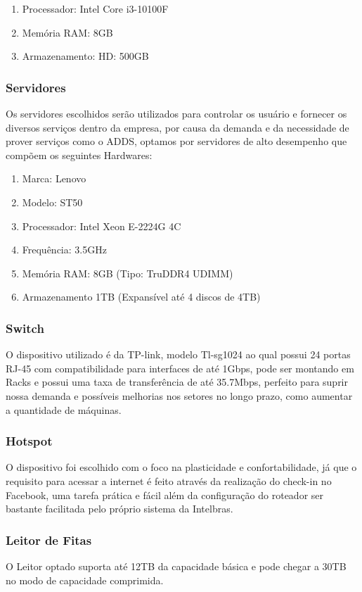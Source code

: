 \documentclass[12pt]{article}
\begin{document}
\begin{enumerate}
    \item Processador: Intel Core i3-10100F
    \item Memória RAM: 8GB
    \item Armazenamento: HD: 500GB
\end{enumerate}

\subsubsection{Servidores}
Os servidores escolhidos serão utilizados para controlar os usuário e fornecer os diversos serviços dentro da empresa, por causa da demanda e da necessidade de prover serviços como o ADDS, optamos por servidores de alto desempenho que compõem os seguintes Hardwares:

\begin{enumerate}
    \item Marca: Lenovo
    \item Modelo: ST50
    \item Processador: Intel Xeon E-2224G 4C
    \item Frequência: 3.5GHz
    \item Memória RAM: 8GB (Tipo: TruDDR4 UDIMM)
    \item Armazenamento 1TB (Expansível até 4 discos de 4TB)
\end{enumerate}

\subsubsection{Switch}
O dispositivo utilizado é da TP-link, modelo Tl-sg1024 ao qual possui 24 portas RJ-45 com compatibilidade para interfaces de até 1Gbps, pode ser montando em Racks e possui uma taxa de transferência de até 35.7Mbps, perfeito para suprir nossa demanda e possíveis melhorias nos setores no longo prazo, como aumentar a quantidade de máquinas.

\subsubsection{Hotspot}
O dispositivo foi escolhido com o foco na plasticidade e confortabilidade, já que o requisito para acessar a internet é feito através da realização do check-in no Facebook, uma tarefa prática e fácil além da configuração do roteador ser bastante facilitada pelo próprio sistema da Intelbras.

\subsubsection{Leitor de Fitas}
O Leitor optado suporta até 12TB da capacidade básica e pode chegar a 30TB no modo de capacidade comprimida.
\end{document}

